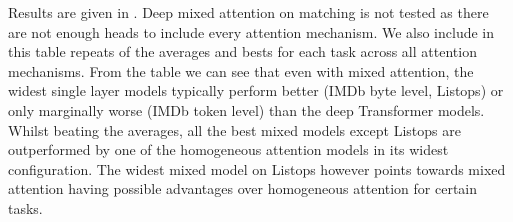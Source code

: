 Results are given in .
Deep mixed attention on matching is not tested as there are not enough heads to include every attention mechanism.
We also include in this table repeats of the averages and bests for each task across all attention mechanisms.
From the table we can see that even with mixed attention, the widest single layer models typically perform better (IMDb byte level, Listops) or only marginally worse (IMDb token level) than the deep Transformer models.
Whilst beating the averages, all the best mixed models except Listops are outperformed by one of the homogeneous attention models in its widest configuration.
The widest mixed model on Listops however points towards mixed attention having possible advantages over homogeneous attention for certain tasks.

